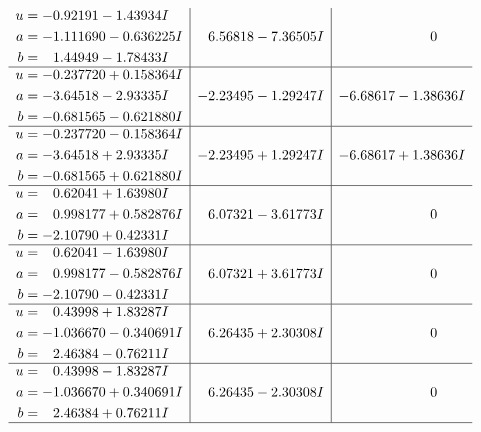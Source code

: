 \documentclass[1p]{elsarticle_modified}
\theoremstyle{definition}
\begin{document}
$$\begin{array}{c|c|c}
\begin{aligned}
u &= -0.92191 - 1.43934 I \\
a &= -1.111690 - 0.636225 I \\
b &= \phantom{-}1.44949 - 1.78433 I\end{aligned}
 & \phantom{-}6.56818 - 7.36505 I & \phantom{-0.000000 } 0 \\ \hline\begin{aligned}
u &= -0.237720 + 0.158364 I \\
a &= -3.64518 - 2.93335 I \\
b &= -0.681565 - 0.621880 I\end{aligned}
 & -2.23495 - 1.29247 I & -6.68617 - 1.38636 I \\ \hline\begin{aligned}
u &= -0.237720 - 0.158364 I \\
a &= -3.64518 + 2.93335 I \\
b &= -0.681565 + 0.621880 I\end{aligned}
 & -2.23495 + 1.29247 I & -6.68617 + 1.38636 I \\ \hline\begin{aligned}
u &= \phantom{-}0.62041 + 1.63980 I \\
a &= \phantom{-}0.998177 + 0.582876 I \\
b &= -2.10790 + 0.42331 I\end{aligned}
 & \phantom{-}6.07321 - 3.61773 I & \phantom{-0.000000 } 0 \\ \hline\begin{aligned}
u &= \phantom{-}0.62041 - 1.63980 I \\
a &= \phantom{-}0.998177 - 0.582876 I \\
b &= -2.10790 - 0.42331 I\end{aligned}
 & \phantom{-}6.07321 + 3.61773 I & \phantom{-0.000000 } 0 \\ \hline\begin{aligned}
u &= \phantom{-}0.43998 + 1.83287 I \\
a &= -1.036670 - 0.340691 I \\
b &= \phantom{-}2.46384 - 0.76211 I\end{aligned}
 & \phantom{-}6.26435 + 2.30308 I & \phantom{-0.000000 } 0 \\ \hline\begin{aligned}
u &= \phantom{-}0.43998 - 1.83287 I \\
a &= -1.036670 + 0.340691 I \\
b &= \phantom{-}2.46384 + 0.76211 I\end{aligned}
 & \phantom{-}6.26435 - 2.30308 I & \phantom{-0.000000 } 0\\
 \hline 
 \end{array}$$\newpage\newpage\renewcommand{\arraystretch}{1}
\end{document}
